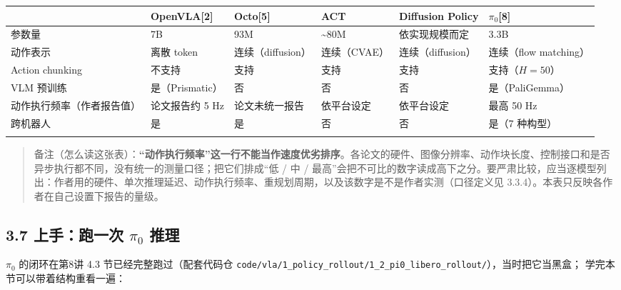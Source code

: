\documentclass[
  chinese,
]{ctexart}
\begin{document}
\begin{center}
\begin{tabular}{@{}>{\raggedright\arraybackslash}p{} >{\raggedright\arraybackslash}p{} >{\raggedright\arraybackslash}p{} >{\raggedright\arraybackslash}p{} >{\raggedright\arraybackslash}p{} >{\raggedright\arraybackslash}p{}@{}}
\toprule\noalign{}
 & OpenVLA{[}2{]} & Octo{[}5{]} & ACT & Diffusion Policy & \(\pi_0\){[}8{]} \\
\midrule\noalign{}
参数量 & 7B & 93M & \textasciitilde80M & 依实现规模而定 & 3.3B \\
动作表示 & 离散 token & 连续（diffusion） & 连续（CVAE） & 连续（diffusion） & 连续（flow matching） \\
Action chunking & 不支持 & 支持 & 支持 & 支持 & 支持（\(H=50\)） \\
VLM 预训练 & 是（Prismatic） & 否 & 否 & 否 & 是（PaliGemma） \\
动作执行频率（作者报告值） & 论文报告约 5 Hz & 论文未统一报告 & 依平台设定 & 依平台设定 & 最高 50 Hz \\
跨机器人 & 是 & 是 & 否 & 否 & 是（7 种构型） \\
\bottomrule\noalign{}
\end{tabular}
\end{center}

\begin{quote}
备注（怎么读这张表）：\textbf{``动作执行频率''这一行不能当作速度优劣排序}。各论文的硬件、图像分辨率、动作块长度、控制接口和是否异步执行都不同，没有统一的测量口径；把它们排成``低
/ 中 /
最高''会把不可比的数字读成高下之分。要严肃比较，应当逐模型列出：作者用的硬件、单次推理延迟、动作执行频率、重规划周期，以及该数字是不是作者实测（口径定义见
3.3.4）。本表只反映各作者在自己设置下报告的量级。
\end{quote}

\subsection{\texorpdfstring{3.7 上手：跑一次 \(\pi_0\)
推理}{3.7 上手：跑一次 \textbackslash pi\_0 推理}}\label{ux4e0aux624bux8dd1ux4e00ux6b21-pi_0-ux63a8ux7406}

\(\pi_0\) 的闭环在第8讲 4.3 节已经完整跑过（配套代码仓
\texttt{code/vla/1\_policy\_rollout/1\_2\_pi0\_libero\_rollout/}），当时把它当黑盒；
学完本节可以带着结构重看一遍：
\end{document}
